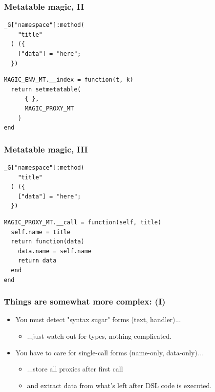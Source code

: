 \documentclass[handout]{beamer}
\begin{document}

\begin{frame}[fragile]

\frametitle{Metatable magic, II}

\begin{verbatim}
_G["namespace"]:method(
    "title"
  ) ({
    ["data"] = "here";
  })
\end{verbatim}

\begin{verbatim}
MAGIC_ENV_MT.__index = function(t, k)
  return setmetatable(
      { },
      MAGIC_PROXY_MT
    )
end
\end{verbatim}

\end{frame}


\begin{frame}[fragile]

\frametitle{Metatable magic, III}

\begin{verbatim}
_G["namespace"]:method(
    "title"
  ) ({
    ["data"] = "here";
  })
\end{verbatim}

\begin{verbatim}
MAGIC_PROXY_MT.__call = function(self, title)
  self.name = title
  return function(data)
    data.name = self.name
    return data
  end
end
\end{verbatim}

\end{frame}


\begin{frame}

\frametitle{Things are somewhat more complex: (I)}

\begin{itemize}

\item You must detect "syntax sugar" forms (text, handler)...
\pause
  \begin{itemize}
  \item ...just watch out for types, nothing complicated.
  \end{itemize}

\pause

\item You have to care for single-call forms (name-only, data-only)...
\pause
  \begin{itemize}
  \item ...store all proxies after first call
  \item and extract data from what's left after DSL code is executed.
  \end{itemize}

\end{itemize}

\end{frame}
\end{document}
